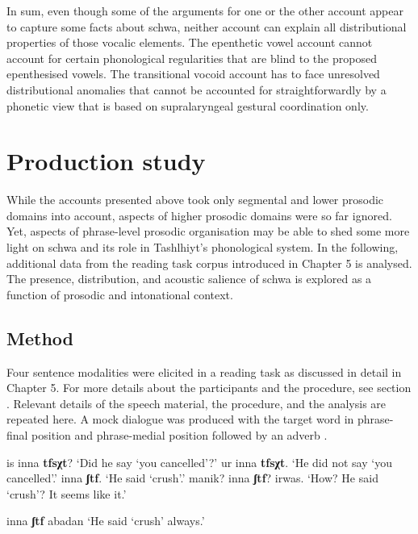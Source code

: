 In sum, even though some of the arguments for one or the other account appear to capture some facts about schwa, neither account can explain all distributional properties of those vocalic elements. The epenthetic vowel account cannot account for certain phonological regularities that are blind to the proposed epenthesised vowels. The transitional vocoid account has to face unresolved distributional anomalies that cannot be accounted for straightforwardly by a phonetic view that is based on supralaryngeal gestural coordination only. 

\section{Production study}\label{sec:6.4}
While the accounts presented above took only segmental and lower prosodic domains into account, aspects of higher prosodic domains were so far ignored. Yet, aspects of phrase-level prosodic organisation may be able to shed some more light on schwa and its role in Tashlhiyt’s phonological system. In the following, additional data from the reading task corpus introduced in Chapter 5 is analysed. The presence, distribution, and acoustic salience of schwa is explored as a function of prosodic and intonational context.

\subsection{Method}
Four sentence modalities were elicited in a reading task as discussed in detail in Chapter 5. For more details about the participants and the procedure, see section . Relevant details of the speech material, the procedure, and the analysis are repeated here. A mock dialogue was produced with the target word in phrase-final position  and phrase-medial position followed by an adverb .

\begin{exe}
\ex\label{ex:6:2} \begin{xlist}
                \ex\label{ex:6:2a} is inna \textbf{tfsχt}?  \newline
                ‘Did he say ‘you cancelled’?’ 
                \ex\label{ex:6:2b} ur inna \textbf{tfsχt}.  \newline 
				‘He did not say ‘you cancelled’.’ 
				\ex\label{ex:6:2c} inna \textbf{ʃtf}.  \newline 
				‘He said ‘crush’.’ 
                \ex\label{ex:6:2d} manik? inna \textbf{ʃtf}? irwas. \newline 
				‘How? He said ‘crush’? It seems like it.’                
\end{xlist}
\ex\label{ex:6:3} inna \textbf{ʃtf} abadan \newline
‘He said ‘crush’ always.’
\end{exe} 

